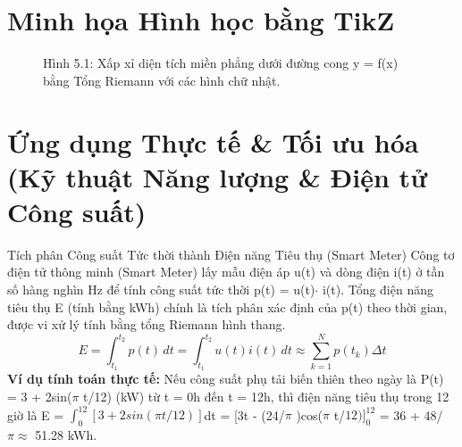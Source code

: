 \documentclass[11pt,a4paper,oneside]{book}
\begin{document}
\section{Minh họa Hình học bằng TikZ}
\begin{figure}[htbp]
\centering
{}
\caption{Hình 5.1: Xấp xỉ diện tích miền phẳng dưới đường cong y = f(x) bằng Tổng Riemann với các hình chữ nhật.}
\label{fig:tikz-ch5-riemann}
\end{figure}

\section{Ứng dụng Thực tế \& Tối ưu hóa (Kỹ thuật Năng lượng \& Điện tử Công suất)}
\begin{ungdung}{Tích phân Công suất Tức thời thành Điện năng Tiêu thụ (Smart Meter)}
Công tơ điện tử thông minh (Smart Meter) lấy mẫu điện áp u(t) và dòng điện i(t) ở tần số hàng nghìn Hz để tính công suất tức thời p(t) = u(t)$\cdot$ i(t). Tổng điện năng tiêu thụ E (tính bằng kWh) chính là tích phân xác định của p(t) theo thời gian, được vi xử lý tính bằng tổng Riemann hình thang.
\[ E = \int_{t_1}^{t_2} p(t)\,dt = \int_{t_1}^{t_2} u(t)i(t)\,dt \approx \sum_{k=1}^N p(t_k)\Delta t \]
\noindent\textbf{Ví dụ tính toán thực tế:} Nếu công suất phụ tải biến thiên theo ngày là P(t) = 3 + 2sin($\pi$ t/12) (kW) từ t = 0h đến t = 12h, thì điện năng tiêu thụ trong 12 giờ là E = $\int_0^{12} [3 + 2sin(\pi t/12)]$dt = [3t - (24/$\pi$ )cos($\pi$ t/$12)]_0^{12}$ = 36 + 48/$\pi \approx$  51.28 kWh.
\end{ungdung}
\end{document}
